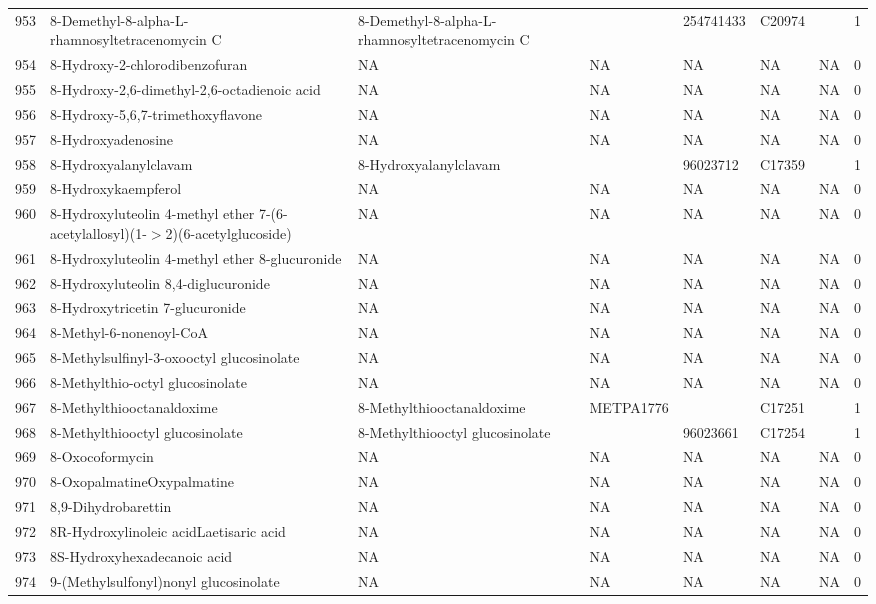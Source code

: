 \documentclass[a4paper]{article}
\begin{document}
\begin{longtable}{rlllllll}
  953 & 8-Demethyl-8-alpha-L-rhamnosyltetracenomycin C & 8-Demethyl-8-alpha-L-rhamnosyltetracenomycin C &  & 254741433 & C20974 &  & 1 \\ 
  954 & 8-Hydroxy-2-chlorodibenzofuran & NA & NA & NA & NA & NA & 0 \\ 
  955 & 8-Hydroxy-2,6-dimethyl-2,6-octadienoic acid & NA & NA & NA & NA & NA & 0 \\ 
  956 & 8-Hydroxy-5,6,7-trimethoxyflavone & NA & NA & NA & NA & NA & 0 \\ 
  957 & 8-Hydroxyadenosine & NA & NA & NA & NA & NA & 0 \\ 
  958 & 8-Hydroxyalanylclavam & 8-Hydroxyalanylclavam &  & 96023712 & C17359 &  & 1 \\ 
  959 & 8-Hydroxykaempferol & NA & NA & NA & NA & NA & 0 \\ 
  960 & 8-Hydroxyluteolin 4-methyl ether 7-(6-acetylallosyl)(1-$>$2)(6-acetylglucoside) & NA & NA & NA & NA & NA & 0 \\ 
  961 & 8-Hydroxyluteolin 4-methyl ether 8-glucuronide & NA & NA & NA & NA & NA & 0 \\ 
  962 & 8-Hydroxyluteolin 8,4-diglucuronide & NA & NA & NA & NA & NA & 0 \\ 
  963 & 8-Hydroxytricetin 7-glucuronide & NA & NA & NA & NA & NA & 0 \\ 
  964 & 8-Methyl-6-nonenoyl-CoA & NA & NA & NA & NA & NA & 0 \\ 
  965 & 8-Methylsulfinyl-3-oxooctyl glucosinolate & NA & NA & NA & NA & NA & 0 \\ 
  966 & 8-Methylthio-octyl glucosinolate & NA & NA & NA & NA & NA & 0 \\ 
  967 & 8-Methylthiooctanaldoxime & 8-Methylthiooctanaldoxime & METPA1776 &  & C17251 &  & 1 \\ 
  968 & 8-Methylthiooctyl glucosinolate & 8-Methylthiooctyl glucosinolate &  & 96023661 & C17254 &  & 1 \\ 
  969 & 8-Oxocoformycin & NA & NA & NA & NA & NA & 0 \\ 
  970 & 8-OxopalmatineOxypalmatine & NA & NA & NA & NA & NA & 0 \\ 
  971 & 8,9-Dihydrobarettin & NA & NA & NA & NA & NA & 0 \\ 
  972 & 8R-Hydroxylinoleic acidLaetisaric acid & NA & NA & NA & NA & NA & 0 \\ 
  973 & 8S-Hydroxyhexadecanoic acid & NA & NA & NA & NA & NA & 0 \\ 
  974 & 9-(Methylsulfonyl)nonyl glucosinolate & NA & NA & NA & NA & NA & 0 \\ 

\end{longtable}
\end{document}
